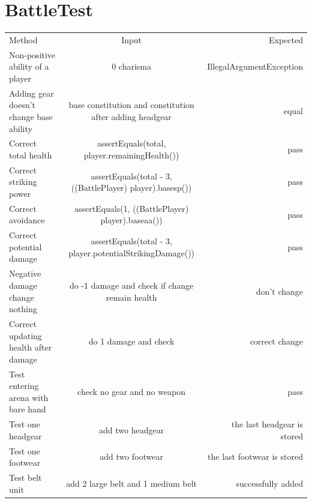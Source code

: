 \documentclass[12pt]{amsart}
\begin{document}
\section{BattleTest}
\begin{table}[htbp]
   \begin{tabular}{@{} lcr @{}} %

      Method      & Input & Expected \\
         Non-positive ability of a player       & 0 charisma     &  IllegalArgumentException \\
         Adding gear doesn't change base ability       & base constitution and constitution after adding headgear     &  equal \\
         Correct total health & assertEquals(total, player.remainingHealth()) & pass \\
         Correct striking power & assertEquals(total - 3, ((BattlePlayer) player).basesp()) & pass \\
         Correct avoidance & assertEquals(1, ((BattlePlayer) player).baseaa()) & pass \\
         Correct potential damage & assertEquals(total - 3, player.potentialStrikingDamage()) & pass \\
         Negative damage change nothing & do -1 damage and check if change remain health & don't change\\
         Correct updating health after damage & do 1 damage and check & correct change \\
         Test entering arena with bare hand & check no gear and no weapon & pass \\
         Test one headgear & add two headgear & the last headgear is stored \\
         Test one footwear & add two footwear & the last footwear is stored \\
         Test belt unit & add 2 large belt and 1 medium belt & successfully added \\
         

    \end{tabular}
\end{table}
\end{document}
